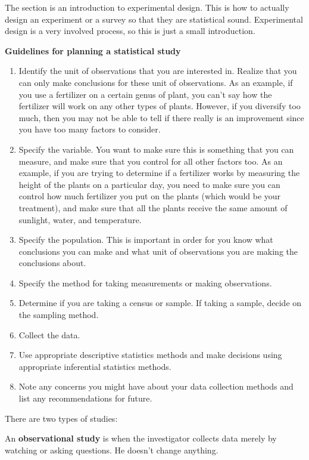 \documentclass[]{book}
\begin{document}
The section is an introduction to experimental design. This is how to actually design an experiment or a survey so that they are statistical sound. Experimental design is a very involved process, so this is just a small introduction.

\textbf{Guidelines for planning a statistical study}

\begin{enumerate}
\def\labelenumi{\arabic{enumi}.}
\item
  Identify the unit of observations that you are interested in. Realize that you can only make conclusions for these unit of observations. As an example, if you use a fertilizer on a certain genus of plant, you can't say how the fertilizer will work on any other types of plants. However, if you diversify too much, then you may not be able to tell if there really is an improvement since you have too many factors to consider.
\item
  Specify the variable. You want to make sure this is something that you can measure, and make sure that you control for all other factors too. As an example, if you are trying to determine if a
  fertilizer works by measuring the height of the plants on a particular day, you need to make sure you can control how much fertilizer you put on the plants (which would be your treatment), and make sure that all the plants receive the same amount of sunlight, water, and temperature.
\item
  Specify the population. This is important in order for you know what conclusions you can make and what unit of observations you are making the conclusions about.
\item
  Specify the method for taking measurements or making observations.
\item
  Determine if you are taking a census or sample. If taking a sample, decide on the sampling method.
\item
  Collect the data.
\item
  Use appropriate descriptive statistics methods and make decisions using appropriate inferential statistics methods.
\item
  Note any concerns you might have about your data collection methods and list any recommendations for future.
\end{enumerate}

There are two types of studies:

An \textbf{observational study} is when the investigator collects data merely by watching or asking questions. He doesn't change anything.
\end{document}
